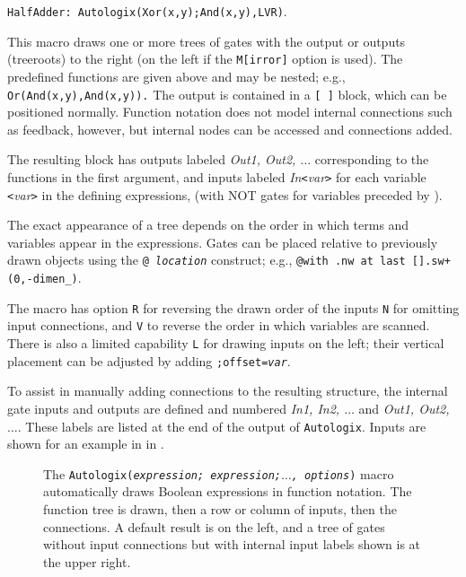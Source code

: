 {\tt HalfAdder: Autologix(Xor(x,y);And(x,y),LVR)}.

This macro draws one or more trees of gates with the output or outputs
(treeroots) to the right (on the left if the {\tt M[irror]} option is used).
The predefined functions are given above
and may be nested; e.g., {\tt Or(And(x,{}y),And({}x,y)).}
The output is contained in a {\tt [ ]} block, which can be positioned normally.
Function notation does not model internal connections such as
feedback, however, but internal nodes can be accessed and connections added.

The resulting block has outputs labeled {\sl Out1, Out2, $\ldots$}
corresponding to the functions in the first argument, and inputs
labeled {\sl In{\tt<}var{\tt>}} for each variable {\sl {\tt<}var{\tt>}} in the
defining expressions, (with NOT gates for variables preceded by {\tt{}}).

The exact appearance of a tree depends on the order in which
terms and variables appear in the expressions.  Gates can be placed
relative to previously drawn objects using the {\tt @ {\sl location}} construct;
e.g., {\tt @with .nw at last [].sw+(0,-dimen\_)}.

The macro has option {\tt R} for reversing the drawn order of the inputs
{\tt N} for omitting input connections,
and {\tt V} to reverse the order in which variables are scanned.
There is also a
limited capability {\tt L} for drawing inputs on the left; their vertical
placement can be adjusted by adding {\tt ;offset={\sl var}}.


To assist in manually adding connections to the resulting structure,
the internal gate inputs and outputs are defined and numbered
{\sl In1, In2, $\ldots$} and {\sl Out1, Out2, $\ldots$}.  These labels
are listed at the end of the output of {\tt Autologix}. Inputs
are shown for an example in in .
\begin{figure}[H]
   
   \caption{The {\tt Autologix({\sl expression; expression;$\ldots$, options})}
     macro automatically draws Boolean expressions in function
     notation. The function tree is drawn, then a row or column of inputs,
     then the connections. A default result is on the left, and a tree
     of gates without input connections but with internal input labels
     shown is at the upper right.}
   \label{Alogix}
   \end{figure}

